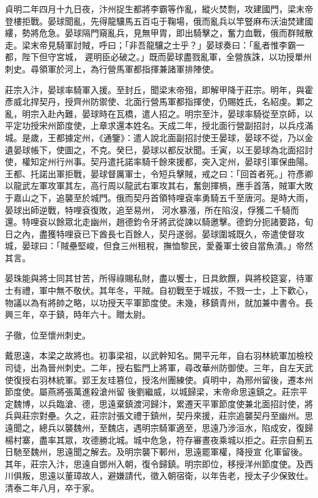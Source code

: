 \begin{pinyinscope}
 貞明二年四月十九日夜，汴州捉生都將李霸等作亂，縱火焚剽，攻建國門，梁末帝登樓拒戰。晏球聞亂，先得龍驤馬五百屯于鞠場，俄而亂兵以竿豎麻布沃油焚建國縷，勢將危急。晏球隔門窺亂兵，見無甲胄，即出騎擊之，奮力血戰，俄而群賊散走。梁末帝見騎軍討賊，呼曰；「非吾龍驤之士乎？」晏球奏曰：「亂者惟李霸一都，陛下但守宮城，
 遲明臣必破之。」既而晏球盡戮亂軍，全營族誅，以功授單州刺史。尋領軍於河上，為行營馬軍都指揮兼諸軍排陣使。



 莊宗入汴，晏球率騎軍入援。至封丘，聞梁末帝殂，即解甲降于莊宗。明年，與霍彥威北捍契丹，授齊州防禦使、北面行營馬軍都指揮使，仍賜姓氏，名紹虔。鄴之亂，明宗入赴內難，晏球時在瓦橋，遣人招之。明宗至汴，晏球率騎從至京師，以平定功授宋州節度使，上章求還本姓名。天成二年，授北面行營副招討，以兵戍滿
 城。是歲，王都據定州，《通鑒》：遣人說北面副招討使王晏球，晏球不從，乃以金遺晏球帳下，使圖之，不克。癸巳，晏球以都反狀聞。壬寅，以王晏球為北面招討使，權知定州行州事。契丹遣托諾率騎千餘來援都，突入定州，晏球引軍保曲陽。王都、托諾出軍拒戰，晏球督厲軍士，令短兵擊賊，戒之曰：「回首者死。」符彥卿以龍武左軍攻軍其左，高行周以龍武右軍攻其右，奮劍揮楇，應手首落，賊軍大敗于嘉山之下，追襲至於城門。俄而契丹首領特哩袞率勇騎五千至唐河。是時大雨，晏球出師逆戰，特哩袞復敗，追至易州，
 河水暴漲，所在陷沒，俘獲二千騎而還。特哩袞以餘眾北走幽州，趙德鈞令牙將武從諫以騎邀擊。德鈞分扼諸要路，旬日之內，盡獲特哩袞已下酋長七百餘人，契丹遂弱。晏球圍城既久，帝遣使督攻城，晏球曰：「賊壘堅峻，但食三州租稅，撫恤黎民，愛養軍士彼自當魚潰。」帝然其言。



 晏珠能與將士同其甘苦，所得祿賜私財，盡以饗士，日具飲饌，與將校筵宴，待軍士有禮，軍中無不敬伏。其年冬，平賊。自初戰至于城拔，不戮一士，上下歡心，
 物議以為有將帥之略，以功授天平軍節度使。未幾，移鎮青州，就加兼中書令。長興三年，卒于鎮，時年六十。贈太尉。



 子徹，位至懷州刺史。



 戴思遠，本梁之故將也。初事梁祖，以武幹知名。開平元年，自右羽林統軍加檢校司徒，出為晉州刺史。二年，授右監門上將軍，尋改華州防御使。三年，自左天武使復授右羽林統軍。郢王友珪篡位，授洺州團練使。貞明中，為邢州留後，遷本州節度使。屬燕將張萬進殺滄州留
 後劉繼威，以城歸梁，末帝命思遠鎮之。莊宗平定魏博，以兵臨滄、德，思遠棄鎮渡河歸汴，累遷天平軍節度使兼北面招討使，將兵與莊宗對壘。久之，莊宗討張文禮于鎮州，契丹來援，莊宗追襲契丹至幽州。思遠聞之，總兵以襲魏州，至魏店，遇明宗騎軍適至，思遠乃涉洹水，陷成安，復歸楊村寨，盡率其眾，攻德勝北城。城中危急，符存審晝夜乘城以拒之。莊宗自薊五日馳至魏州，思遠聞之解去。及明宗襲下鄆州，思遠罷軍權，降授宣
 化軍留後。其年，莊宗入汴，思遠自鄧州入朝，復令歸鎮。明宗即位，移授洋州節度使。及西川俱叛，思遠以董璋故人，避嫌請代，徵入朝宿衛，以年告老，授太子少保致仕。清泰二年八月，卒于家。




\end{pinyinscope}
